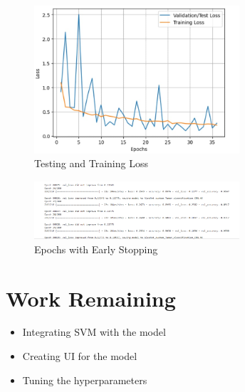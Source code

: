 \begin{figure}[H] %
\begin{center}
	\includegraphics[width=3in]{images/loss.jpg} 
	\caption{Testing and Training Loss} %
	\label{Testing and Training Loss} %
\end{center}
\end{figure}

\begin{figure}[H] %
\begin{center}
	\includegraphics[width=3in]{images/epochs.png} 
	\caption{Epochs with Early Stopping} %
	\label{Epochs with Early Stopping} %
\end{center}
\end{figure}
	


\section{Work Remaining}
\vspace{-18pt}
\begin{itemize}
\item Integrating SVM with the model
\item Creating UI for the model
\item Tuning the hyperparameters
\end{itemize}
\renewcommand\bibname{REFERENCES} %

